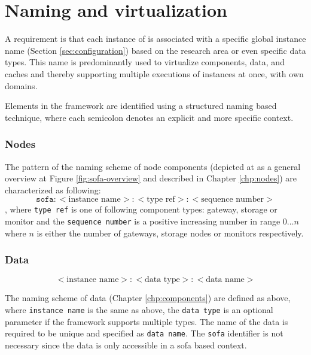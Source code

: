 \section{Naming and virtualization} \label{sec:virtualization}
A requirement is that each instance of \CodeNameFull is associated with a specific global instance name (Section \ref{sec:configuration}) \eg based on the research area or even specific data types. This name is predominantly used to virtualize components, data, and caches and thereby supporting multiple executions of \CodeName instances at once, with own domains.
\newline

Elements in the framework are identified using a structured naming based technique\cite{Tanenbaum:2006:DSP:1202502}, where each semicolon denotes an explicit and more specific context. 

\subsubsection*{Nodes}
The pattern of the naming scheme of node components (depicted at as a general overview at Figure \ref{fig:sofa-overview} and described in Chapter \ref{chp:nodes}) are characterized as following:
\begin{equation*}
	\texttt{sofa}:<\text{instance name}>:<\text{type ref}>:<\text{sequence number}>
\end{equation*}
, where \texttt{type ref} is one of following component types: gateway, storage or monitor and the \texttt{sequence number} is a positive increasing number in range $0\ldots n$ where $n$ is either the number of gateways, storage nodes or monitors respectively.

\subsubsection*{Data}
\begin{equation*}
	<\text{instance name}>:<\text{data type}>:<\text{data name}>
\end{equation*}

The naming scheme of data (Chapter \ref{chp:components}) are defined as above, where \texttt{instance name} is the same as above, the \texttt{data type} is an optional parameter if the framework supports multiple types. The name of the data is required to be unique and specified as \texttt{data name}. The \texttt{sofa} identifier is not necessary since the data is only accessible in a sofa based context.

